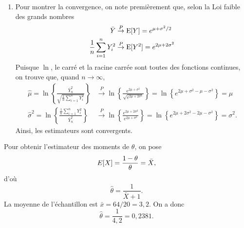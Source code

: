 \begin{solution}{4.2}
\begin{enumerate}
\item Pour montrer la convergence, on note premièrement que, selon la Loi faible des grands nombres
\begin{align*}
\bar Y &\stackrel{P}{\rightarrow} \operatorname{E}[Y]=e^{\mu+\sigma^2/2}\\
\frac{1}{n}\sum_{i=1}^n Y_i^2 &\stackrel{P}{\rightarrow} \operatorname{E}[Y^2]=e^{2\mu+2\sigma^2}\\
\end{align*}
Puisque $\ln$, le carré et la racine carrée sont toutes des fonctions continues, on trouve que, quand $n\to\infty$,
\begin{align*}
\hat\mu = \ln\left\{\frac{\bar Y_n^2}{\sqrt{\frac{1}{n}\sum_{i=1}^n Y_i^2}} \right\} &\stackrel{P}{\rightarrow} \ln\left\{\frac{ e^{2\mu+\sigma^2}}{\sqrt{e^{2\mu+2\sigma^2}}} \right\}=\ln\left\{ e^{2\mu+\sigma^2-\mu-\sigma^2} \right\}=\mu\\
\hat\sigma^2 = \ln\left\{\frac{\frac{1}{n}\sum_{i=1}^n Y_i^2}{\bar Y_n^2} \right\} &\stackrel{P}{\rightarrow} \ln\left\{\frac{e^{2\mu+2\sigma^2}}{e^{2\mu+\sigma^2}} \right\}=\ln\left\{e^{2\mu+2\sigma^2-2\mu-\sigma^2} \right\}=\sigma^2.
\end{align*}
Ainsi, les estimateurs sont convergents.
\end{enumerate}
\end{solution}
\begin{solution}{4.3}
    Pour obtenir l'estimateur des moments de $\theta$, on pose
    \begin{equation*}
      E [ X ] = \frac{1 - \theta}{\theta} = \bar{X},
    \end{equation*}
    d'où
    \begin{equation*}
      \hat{\theta} = \frac{1}{\bar{X} + 1}.
    \end{equation*}
    La moyenne de l'échantillon est $\bar{x} = 64/20 = 3,2$. On a donc
    \begin{equation*}
      \hat{\theta} = \frac{1}{4,2} = 0,2381.
    \end{equation*}
  
\end{solution}
